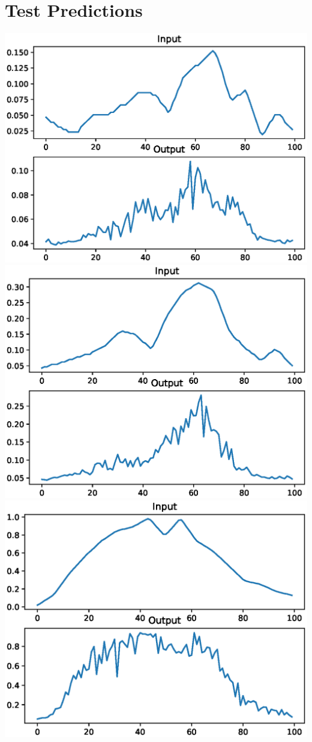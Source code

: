 \documentclass[12pt]{article}
\begin{document}
{\section{Test Predictions}
\includegraphics[scale=0.5]{example1}
\includegraphics[scale=0.5]{example2}
\includegraphics[scale=0.5]{example3}
}
\end{document}
